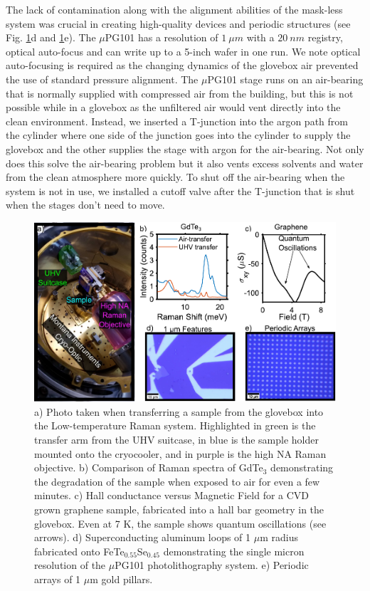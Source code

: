 The lack of contamination along with the alignment abilities of the mask-less system was crucial in creating high-quality devices and periodic structures (see Fig. \ref{fig:FabricationFigure}d and \ref{fig:FabricationFigure}e). The $\mu$PG101 has a resolution of $1~\mu m$ with a $20~nm$ registry, optical auto-focus and can write up to a 5-inch wafer in one run. We note optical auto-focusing is required as the changing dynamics of the glovebox air prevented the use of standard pressure alignment. The $\mu$PG101 stage runs on an air-bearing that is normally supplied with compressed air from the building, but this is not possible while in a glovebox as the unfiltered air would vent directly into the clean environment. Instead, we inserted a T-junction into the argon path from the cylinder where one side of the junction goes into the cylinder to supply the glovebox and the other supplies the stage with argon for the air-bearing. Not only does this solve the air-bearing problem but it also vents excess solvents and water from the clean atmosphere more quickly. To shut off the air-bearing when the system is not in use, we installed a cutoff valve after the T-junction that is shut when the stages don't need to move.
\par

\begin{figure}
    \centering
    \includegraphics[width=\textwidth]{Chap2/Figures/FabricationFigure.pdf}
    \caption{a) Photo taken when transferring a sample from the glovebox into the Low-temperature Raman system. Highlighted in green is the transfer arm from the UHV suitcase, in blue is the sample holder mounted onto the cryocooler, and in purple is the high NA Raman objective. b) Comparison of Raman spectra of GdTe$_{3}$ demonstrating the degradation of the sample when exposed to air for even a few minutes. c) Hall conductance versus Magnetic Field for a CVD grown graphene sample, fabricated into a hall bar geometry in the glovebox. Even at 7 K, the sample shows quantum oscillations (see arrows). d) Superconducting aluminum loops of 1 $\mu$m radius fabricated onto FeTe$_{0.55}$Se$_{0.45}$ demonstrating the single micron resolution of the $\mu$PG101 photolithography system. e) Periodic arrays of 1 $\mu$m gold pillars.}
    \label{fig:FabricationFigure}
\end{figure}

